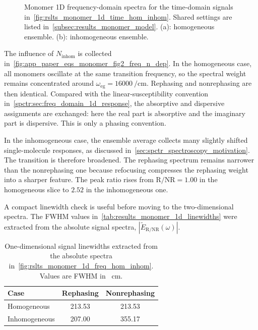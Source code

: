 \begin{figure}[htbp]
    \centering
\caption{Monomer 1D frequency-domain spectra for the time-domain signals
in~\autoref{fig:rslts_monomer_1d_time_hom_inhom}. Shared settings are listed
in~\autoref{subsec:results_monomer_model}. (a): homogeneous ensemble.
(b): inhomogeneous ensemble.}
    \label{fig:rslts_monomer_1d_freq_hom_inhom}
\end{figure}

The influence of \(N_{\mathrm{inhom}}\) is collected in~\autoref{fig:app_paper_eqs_monomer_fig2_freq_n_dep}. In the homogeneous case, all monomers oscillate at the same transition frequency, so the spectral weight remains concentrated around \(\omega_{\mathrm{eg}}=\SI{16000}{\per\centi\metre}\). Rephasing and nonrephasing are then identical. Compared with the linear-susceptibility convention in~\autoref{spctr:sec:freq_domain_1d_response}, the absorptive and dispersive assignments are exchanged: here the real part is absorptive and the imaginary part is dispersive. This is only a phasing convention.

In the inhomogeneous case, the ensemble average collects many slightly shifted single-molecule responses, as discussed in~\autoref{sec:spctr_spectroscopy_motivation}. The transition is therefore broadened. The rephasing spectrum remains narrower than the nonrephasing one because refocusing compresses the rephasing weight into a sharper feature. The peak ratio rises from \(\mathrm{R}/\mathrm{NR}=1.00\) in the homogeneous slice to \(2.52\) in the inhomogeneous one.

A compact linewidth check is useful before moving to the two-dimensional spectra. The FWHM values in~\autoref{tab:results_monomer_1d_linewidths} were extracted from the absolute signal spectra, \(|\tilde{E}_{\mathrm{R/NR}}(\omega)|\).

\begin{table}[htbp]
    \centering
    \small
    \caption{One-dimensional signal linewidths extracted from the absolute spectra in~\autoref{fig:rslts_monomer_1d_freq_hom_inhom}. Values are FWHM in \si{\per\centi\metre}.}
    \label{tab:results_monomer_1d_linewidths}
    \begin{tabular}{@{}lcc@{}}
        \toprule
        Case & Rephasing & Nonrephasing \\
        \midrule
        Homogeneous & 213.53 & 213.53 \\
        Inhomogeneous & 207.00 & 355.17 \\
        \bottomrule
    \end{tabular}
\end{table}

